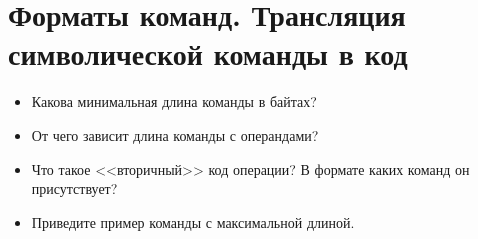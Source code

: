 \chapter{Форматы команд. Трансляция символической команды в код}
\begin{itemize}
\item Какова минимальная длина команды в байтах?
\item От чего зависит длина команды с операндами?
\item Что такое <<вторичный>> код операции? В формате каких команд он присутствует?
\item Приведите пример команды с максимальной длиной.
\end{itemize}
\endinput
